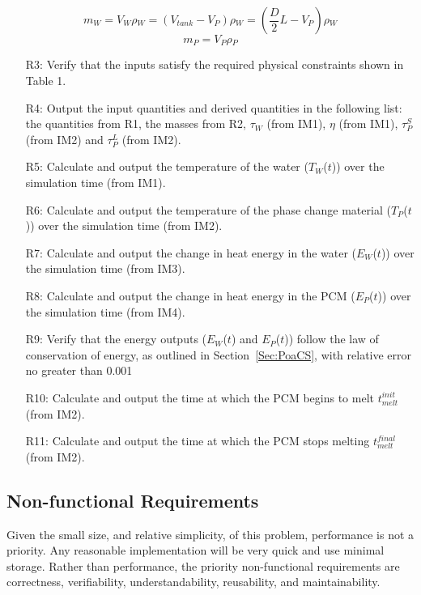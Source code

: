 \documentclass[12pt]{article}
\begin{document}
\begin{equation}
m_{W}=V_{W}\rho{}_{W}=(V_{tank}-V_{P})\rho{}_{W}=(\frac{D}{2}L-V_{P})\rho{}_{W}
\end{equation}
\begin{equation}
m_{P}=V_{P}\rho{}_{P}
\end{equation}
\begin{itemize}
\item[R3:]Verify that the inputs satisfy the required physical constraints shown in Table 1.
\item[R4:]Output the input quantities and derived quantities in the following list: the quantities from R1, the masses from R2, $\tau{}_{W}$ (from IM1), $\eta{}$ (from IM1), $\tau{}_{P}^{S}$ (from IM2) and $\tau{}_{P}^{L}$ (from IM2).
\item[R5:]Calculate and output the temperature of the water ($T_{W}$($t$)) over the simulation time (from IM1).
\item[R6:]Calculate and output the temperature of the phase change material ($T_{P}$($t$)) over the simulation time (from IM2).
\item[R7:]Calculate and output the change in heat energy in the water ($E_{W}$($t$)) over the simulation time (from IM3).
\item[R8:]Calculate and output the change in heat energy in the PCM ($E_{P}$($t$)) over the simulation time (from IM4).
\item[R9:]Verify that the energy outputs ($E_{W}$($t$) and $E_{P}$($t$)) follow the law of conservation of energy, as outlined in Section~\ref{Sec:PoaCS}, with relative error no greater than 0.001%
\item[R10:]Calculate and output the time at which the PCM begins to melt $t_{melt}^{init}$ (from IM2).
\item[R11:]Calculate and output the time at which the PCM stops melting $t_{melt}^{final}$ (from IM2).
\end{itemize}
\subsection{Non-functional Requirements}
\label{Sec:NR}
Given the small size, and relative simplicity, of this problem, performance is not a priority. Any reasonable implementation will be very quick and use minimal storage. Rather than performance, the priority non-functional requirements are correctness, verifiability, understandability, reusability, and maintainability.
\end{document}
